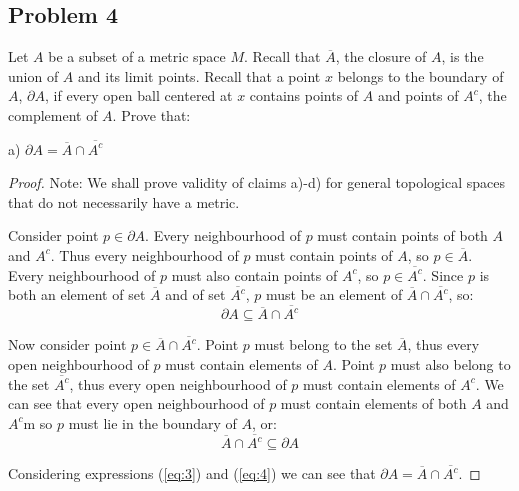 \documentclass{article}
\begin{document}
\subsection*{Problem 4}

\begin{tcolorbox}
Let $A$ be a subset of a metric space $M$.
Recall that $\overline{A}$, the closure of $A$, is the union of $A$ and its limit points.
Recall that a point $x$ belongs to the boundary of $A$, $\partial A$, if every open ball centered at $x$ contains points of $A$ and points of $A^c$, the complement of $A$. Prove that:

a) $\partial A = \overline{A} \cap \overline{A^c}$
\end{tcolorbox}

\begin{proof}

Note: We shall prove validity of claims a)-d) for general topological spaces that do not necessarily have a metric.

Consider point $p \in \partial A$. Every neighbourhood of $p$ must contain points of both $A$ and $A^c$.
Thus every neighbourhood of $p$ must contain points of $A$, so $p \in \overline{A}$.
Every neighbourhood of $p$ must also contain points of $A^c$, so $p \in \overline{A^c}$. 
Since $p$ is both an element of set $\overline{A}$ and of set $\overline{A^c}$, $p$ must be an element of $\overline{A} \cap \overline{A^c}$, so:
\begin{equation} \label{eq:3}
    \partial A \subseteq \overline{A} \cap \overline{A^c}
\end{equation}

Now consider point $p \in \overline{A} \cap \overline{A^c}$.
Point $p$ must belong to the set $\overline{A}$, thus every open neighbourhood of $p$ must contain elements of $A$.
Point $p$ must also belong to the set $\overline{A^c}$, thus every open neighbourhood of $p$ must contain elements of $A^c$.
We can see that every open neighbourhood of $p$ must contain elements of both $A$ and $A^c$m so $p$ must lie in the boundary of $A$, or:
\begin{equation} \label{eq:4}
    \overline{A} \cap \overline{A^c} \subseteq \partial A
\end{equation}

Considering expressions (\ref{eq:3}) and (\ref{eq:4}) we can see that $\partial A = \overline{A} \cap \overline{A^c}$.

\end{proof}
\end{document}
